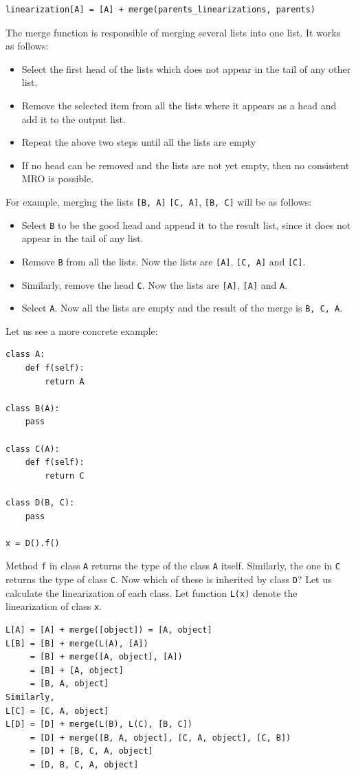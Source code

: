 \begin{lstlisting}
linearization[A] = [A] + merge(parents_linearizations, parents)
\end{lstlisting}
The merge function is responsible of merging several lists into one list. It works as follows:
\begin{itemize}
	\item Select the first head of the lists which does not appear in the tail of any other list.
	\item Remove the selected item from all the lists where it appears as a head and add it to the output list.
	\item Repeat the above two steps until all the lists are empty
	\item If no head can be removed and the lists are not yet empty, then no consistent MRO is possible.
\end{itemize}
For example, merging the lists \lstinline|[B, A]| \lstinline|[C, A]|, \lstinline|[B, C]| will be as follows:
\begin{itemize}
	\item Select \lstinline|B| to be the good head and append it to the result list, since it does not appear in the tail of any list.
	\item Remove \lstinline|B| from all the lists. Now the lists are \lstinline|[A]|, \lstinline|[C, A]| and \lstinline|[C]|.
	\item Similarly, remove the head \lstinline|C|. Now the lists are \lstinline|[A]|, \lstinline|[A]| and \lstinline|A|.
	\item Select \lstinline|A|. Now all the lists are empty and the result of the merge is \lstinline|B, C, A|.
\end{itemize}
Let us see a more concrete example:
\begin{lstlisting}
class A:
	def f(self):
		return A

class B(A):
	pass

class C(A):
	def f(self):
		return C
		
class D(B, C):
	pass
	
x = D().f()
\end{lstlisting}
Method \lstinline|f| in class \lstinline|A| returns the type of the class \lstinline|A| itself. Similarly, the one in \lstinline|C| returns the type of class \lstinline|C|. Now which of these is inherited by class \lstinline|D|? Let us calculate the linearization of each class.
Let function \lstinline|L(x)| denote the linearization of class \lstinline|x|.
\begin{lstlisting}
L[A] = [A] + merge([object]) = [A, object]
L[B] = [B] + merge(L(A), [A])
     = [B] + merge([A, object], [A])
     = [B] + [A, object]
     = [B, A, object]
Similarly,
L[C] = [C, A, object]
L[D] = [D] + merge(L(B), L(C), [B, C])
     = [D] + merge([B, A, object], [C, A, object], [C, B])
     = [D] + [B, C, A, object]
     = [D, B, C, A, object]
\end{lstlisting}
